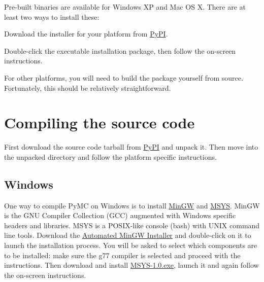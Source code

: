 Pre-built binaries are available for Windows XP and Mac OS X. There are at least
two ways to install these:
\begin{list}{.}
{
\setlength{\rightmargin}{\leftmargin}
}
\item {} 
Download the installer for your platform from \href{http://pypi.python.org/pypi/pymc/}{PyPI}.

\item {} 
Double-click the executable installation package, then follow the
on-screen instructions.

\end{list}

For other platforms, you will need to build the package yourself from source.
Fortunately, this should be relatively straightforward.



\hypertarget{compiling-the-source-code}{}
\section{Compiling the source code}
\label{compiling-the-source-code}

First download the source code tarball from \href{http://pypi.python.org/pypi/pymc/}{PyPI} and unpack it. Then move
into the unpacked directory and follow the platform specific instructions.



\hypertarget{windows}{}
\subsection{Windows}
\label{windows}

One way to compile PyMC on Windows is to install \href{http://www.mingw.org/}{MinGW} and \href{http://www.mingw.org/wiki/MSYS}{MSYS}. MinGW is
the GNU Compiler Collection (GCC) augmented with Windows specific headers and
libraries. MSYS is a POSIX-like console (bash) with UNIX command line tools.
Download the \href{http://sourceforge.net/project/showfiles.php?group_id=2435}{Automated MinGW Installer} and double-click on it to launch
the installation process. You will be asked to select which
components are to be installed: make sure the g77 compiler is selected and
proceed with the instructions. Then download and install \href{http://downloads.sourceforge.net/mingw/MSYS-1.0.10.exe}{MSYS-1.0.exe},
launch it and again follow the on-screen instructions.

